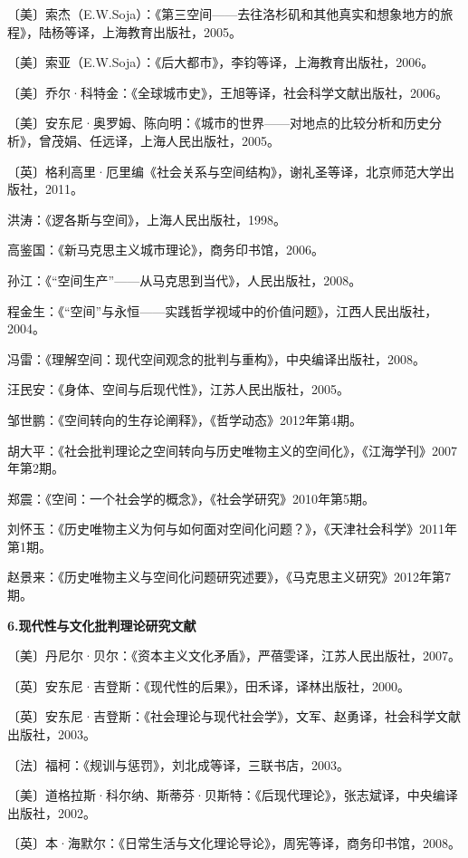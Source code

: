 \documentclass[UTF8, fontset = sourcesans, a4paper, oneside, zihao =
-4, scheme=chinese, no-math, space=true]{ctexbook}
\begin{document}
〔美〕索杰（E.W.Soja）：《第三空间------去往洛杉矶和其他真实和想象地方的旅程》，陆杨等译，上海教育出版社，2005。

〔美〕索亚（E.W.Soja）：《后大都市》，李钧等译，上海教育出版社，2006。

〔美〕乔尔·科特金：《全球城市史》，王旭等译，社会科学文献出版社，2006。

〔美〕安东尼·奥罗姆、陈向明：《城市的世界------对地点的比较分析和历史分析》，曾茂娟、任远译，上海人民出版社，2005。

〔英〕格利高里·厄里编《社会关系与空间结构》，谢礼圣等译，北京师范大学出版社，2011。

洪涛：《逻各斯与空间》，上海人民出版社，1998。

高鉴国：《新马克思主义城市理论》，商务印书馆，2006。

孙江：《``空间生产''------从马克思到当代》，人民出版社，2008。

程金生：《``空间''与永恒------实践哲学视域中的价值问题》，江西人民出版社，2004。

冯雷：《理解空间：现代空间观念的批判与重构》，中央编译出版社，2008。

汪民安：《身体、空间与后现代性》，江苏人民出版社，2005。

邹世鹏：《空间转向的生存论阐释》，《哲学动态》2012年第4期。

胡大平：《社会批判理论之空间转向与历史唯物主义的空间化》，《江海学刊》2007年第2期。

郑震：《空间：一个社会学的概念》，《社会学研究》2010年第5期。

刘怀玉：《历史唯物主义为何与如何面对空间化问题？》，《天津社会科学》2011年第1期。

赵景来：《历史唯物主义与空间化问题研究述要》，《马克思主义研究》2012年第7期。

\textbf{6.现代性与文化批判理论研究文献}

〔美〕丹尼尔·贝尔：《资本主义文化矛盾》，严蓓雯译，江苏人民出版社，2007。

〔英〕安东尼·吉登斯：《现代性的后果》，田禾译，译林出版社，2000。

〔英〕安东尼·吉登斯：《社会理论与现代社会学》，文军、赵勇译，社会科学文献出版社，2003。

〔法〕福柯：《规训与惩罚》，刘北成等译，三联书店，2003。

〔美〕道格拉斯·科尔纳、斯蒂芬·贝斯特：《后现代理论》，张志斌译，中央编译出版社，2002。

〔英〕本·海默尔：《日常生活与文化理论导论》，周宪等译，商务印书馆，2008。
\end{document}
